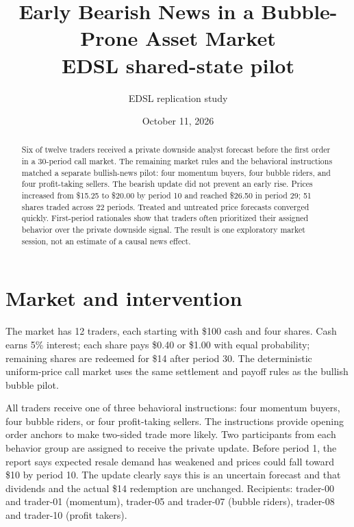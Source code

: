 \documentclass[11pt]{article}
\title{Early Bearish News in a Bubble-Prone Asset Market\\\large EDSL shared-state pilot}
\author{EDSL replication study}
\date{October 11, 2026}
\begin{document}
\maketitle

\begin{abstract}
Six of twelve traders received a private downside analyst forecast before the
first order in a 30-period call market. The remaining market rules and the
behavioral instructions matched a separate bullish-news pilot: four momentum
buyers, four bubble riders, and four profit-taking sellers. The bearish update
did not prevent an early rise. Prices increased from \$15.25 to \$20.00 by
period 10 and reached \$26.50 in period 29; 51 shares traded across 22 periods.
Treated and untreated price forecasts converged quickly. First-period rationales
show that traders often prioritized their assigned behavior over the private
downside signal. The result is one exploratory market session, not an estimate
of a causal news effect.
\end{abstract}

\section{Market and intervention}
The market has 12 traders, each starting with \$100 cash and four shares. Cash
earns 5\% interest; each share pays \$0.40 or \$1.00 with equal probability;
remaining shares are redeemed for \$14 after period 30. The deterministic
uniform-price call market uses the same settlement and payoff rules as the
bullish bubble pilot.

All traders receive one of three behavioral instructions: four momentum buyers,
four bubble riders, or four profit-taking sellers. The instructions provide
opening order anchors to make two-sided trade more likely. Two participants
from each behavior group are assigned to receive the private update. Before
period 1, the report says expected resale demand has weakened and prices could
fall toward \$10 by period 10. The update clearly says this is an uncertain
forecast and that dividends and the actual \$14 redemption are unchanged.
Recipients: trader-00 and trader-01 (momentum), trader-05 and trader-07 (bubble
riders), trader-08 and trader-10 (profit takers).
\end{document}
